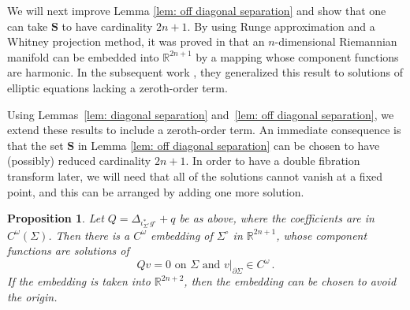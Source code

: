 \documentclass[11pt]{amsart}
\newtheorem{Proposition}[Theorem]{Proposition}
\theoremstyle{definition}
\numberwithin{equation}{section}
\newcommand{\p}{\partial}
\newcommand{\SSS}{\mathbf S}
\begin{document}
We will next improve Lemma \ref{lem: off diagonal separation} and show that one can take $\SSS$ to have cardinality $2n+1$. By using Runge approximation and a Whitney projection method, it was proved in \cite{greene1975whitney} that an \(n\)-dimensional Riemannian manifold can be embedded into \(\mathbb{R}^{2n+1}\) by a mapping whose component functions are harmonic. In the subsequent work \cite{greene1975embedding}, they generalized this result to solutions of elliptic equations lacking a zeroth-order term.

Using Lemmas~\ref{lem: diagonal separation} and~\ref{lem: off diagonal separation}, we extend these results to include a zeroth-order term. An immediate consequence is that the set \(\SSS\) in Lemma \ref{lem: off diagonal separation} can be chosen to have (possibly) reduced cardinality \(2n+1\). In order to have a double fibration transform later, we will need that all of the solutions cannot vanish at a fixed point, and this can be arranged by adding one more solution.%



 \begin{Proposition}\label{prop:GreeneWu_generalization}
Let $Q = \Delta_{\iota^\ast_{\Sigma^\circ}g^\circ}+q$ be as above, where the coefficients are in $C^\omega(\Sigma)$. Then there is a $C^\omega$ embedding of $\Sigma^{\circ}$ in $\mathbb{R}^{2n+1}$, whose component functions are solutions of
\[
Qv = 0 \text{ on } \Sigma \text{ and } v|_{\p \Sigma} \in C^\omega\,.
\]
If the embedding is taken into $\mathbb R^{2n+2}$, then the embedding can be chosen to avoid the origin.
 

 
\end{Proposition}
\end{document}
